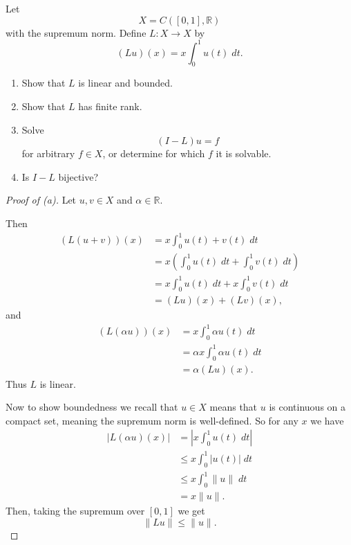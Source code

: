\begin{prob}
    Let 
    \[
        X = C([0,1], \mathbb R)
    \]
    with the supremum norm. Define 
    $L : X \to X$ by 
    \[
        (Lu)(x) = x \int_0^1 u(t) \; dt.
    \]

    \begin{enumerate}[label=\alph*)]
        \item Show that $L$ is linear and bounded. 
        \item Show that $L$ has finite rank. 
        \item Solve 
            \[
                (I - L)u = f
            \]
            for arbitrary $f \in X$, or determine for which $f$ it 
            is solvable.
        \item Is $I-L$ bijective?
    \end{enumerate}
\end{prob}
\begin{proof}[Proof of (a)]
    Let $u,v \in X$ and $\alpha \in \mathbb R$. 

    Then 
    \begin{align*}
        (L(u + v))(x) 
        &= x\int_0^1 u(t) + v(t) \; dt \\ 
        &= x\left(\int_0^1 u(t) \; dt + \int_0^1 v(t)\; dt\right) \\ 
        &= x\int_0^1 u(t) \; dt + x \int_0^1 v(t) \; dt \\ 
        &= (Lu)(x) + (Lv)(x), 
    \end{align*}
    and 
    \begin{align*}
        (L(\alpha u))(x) 
        &= x\int_0^1 \alpha u(t) \; dt \\ 
        &= \alpha x \int_0^1 \alpha u(t) \; dt \\ 
        &= \alpha (Lu)(x). 
    \end{align*}
    Thus $L$ is linear. 

    Now to show boundedness we recall that $u \in X$ means that 
    $u$ is continuous on a compact set, meaning the supremum norm 
    is well-defined. So for any $x$ we have 
    \begin{align*}
        |L(\alpha u)(x)| 
        &= \left|x \int_0^1 u(t) \; dt\right| \\ 
        &\leq x \int_0^1 |u(t)| \;dt \\ 
        &\leq x \int_0^1 \|u\| \; dt \\ 
        &= x \|u\|.
    \end{align*}
    Then, taking the supremum over $[0,1]$ we get 
    \[
        \|Lu\| \leq \|u\|.
    \]
\end{proof}

